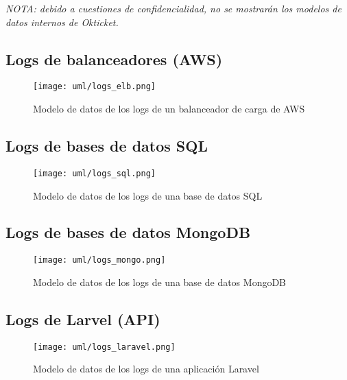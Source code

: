 \emph{NOTA: debido a cuestiones de confidencialidad, no se mostrarán los modelos
de datos internos de Okticket.}

\subsection{Logs de balanceadores (AWS)}
\begin{figure}[H]
	\centering
	\texttt{[image: uml/logs\_elb.png]}
	\caption{Modelo de datos de los logs de un balanceador de carga de AWS}
	\label{fig:logs_elb}
\end{figure}


\newpage{}
\subsection{Logs de bases de datos SQL}
\begin{figure}[H]
	\centering
	\texttt{[image: uml/logs\_sql.png]}
	\caption{Modelo de datos de los logs de una base de datos SQL}
	\label{fig:logs_sql}
\end{figure}


\newpage{}
\subsection{Logs de bases de datos MongoDB}
\begin{figure}[H]
	\centering
	\texttt{[image: uml/logs\_mongo.png]}
	\caption{Modelo de datos de los logs de una base de datos MongoDB}
	\label{fig:logs_mongo}
\end{figure}


\newpage{}
\subsection{Logs de Larvel (API)}
\begin{figure}[H]
	\centering
	\texttt{[image: uml/logs\_laravel.png]}
	\caption{Modelo de datos de los logs de una aplicación Laravel}
	\label{fig:logs_laravel}
\end{figure}
